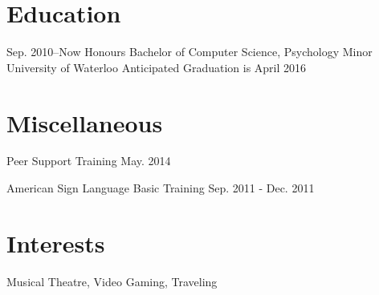 \documentclass[]{friggeri-cv} %
\begin{document}
\section{Education}

\begin{sectionlist}
	
	\entry
	{Sep. 2010--Now}
	{Honours Bachelor of Computer Science, Psychology Minor}
	{University of Waterloo}
	{Anticipated Graduation is April 2016}
\end{sectionlist}

\section{Miscellaneous}

\begin{sectionlist}
\misc
{Peer Support Training}
{May. 2014}

\misc
{American Sign Language Basic Training}
{Sep. 2011 - Dec. 2011}
\end{sectionlist}


\section{Interests}
    \begin{sectionlist}
    	{Musical Theatre, Video Gaming, Traveling}
    \end{sectionlist}
\end{document}
